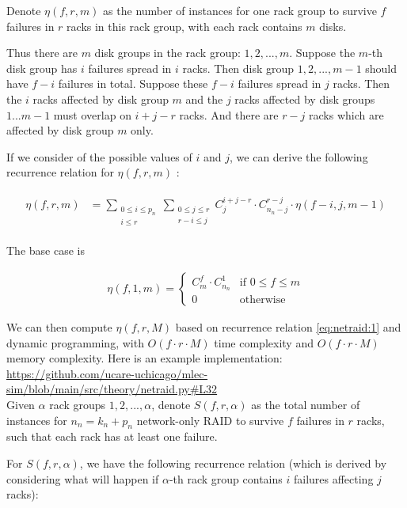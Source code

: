 \documentclass{article}
\begin{document}
Denote $\eta(f,r,m)$ as the number of instances for one rack group to survive $f$ failures in $r$ racks in this rack group, with each rack contains $m$ disks.

Thus there are $m$ disk groups in the rack group: $1,2,..., m$. Suppose the $m$-th disk group has $i$ failures spread in $i$ racks. Then disk group $1,2,...,m-1$ should have $f-i$ failures in total. Suppose these $f-i$ failures spread in $j$ racks. Then the $i$ racks affected by disk group $m$ and the $j$ racks affected by disk groups $1...m-1$ must overlap on $i+j-r$ racks. And there are $r-j$ racks which are affected by disk group $m$ only.

If we consider of the possible values of $i$ and $j$, we can derive the following recurrence relation for $\eta(f,r,m)$ :

\begin{eqnarray}
\begin{aligned}
  \eta(f,r,m) &= \sum_{\substack{0 \leq i \leq p_n \\ i\leq r}} 
                \sum_{\substack{0 \leq j \leq r \\ r-i \leq j}}
                C_{j}^{i+j-r} \cdot C_{n_n-j}^{r-j} \cdot \eta(f-i, j, m-1) 
\end{aligned}
\label{eq:netraid:1}
\end{eqnarray}

The base case is 

\begin{eqnarray}
  \eta(f,1,m) =
    \begin{cases}
      C_{m}^f \cdot C_{n_n}^1 & \text{if $0 \leq f \leq m$}\\
      0 & \text{otherwise}
    \end{cases}       
\label{eq:netraid:2}
\end{eqnarray}

We can then compute $\eta(f,r,M)$ based on recurrence relation \ref{eq:netraid:1} and dynamic programming, with $O(f \cdot r \cdot M)$ time complexity and $O(f \cdot r \cdot M)$ memory complexity. Here is an example implementation: \url{https://github.com/ucare-uchicago/mlec-sim/blob/main/src/theory/netraid.py#L32}\\

Given $\alpha$ rack groups $1,2,...,\alpha$, denote $S(f,r, \alpha)$ as the total number of instances for $n_n=k_n+p_n$ network-only RAID to survive $f$ failures in $r$ racks, such that each rack has at least one failure.

For $S(f,r,\alpha)$, we have the following recurrence relation (which is derived by considering what will happen if $\alpha$-th rack group contains $i$ failures affecting $j$ racks):
\end{document}
